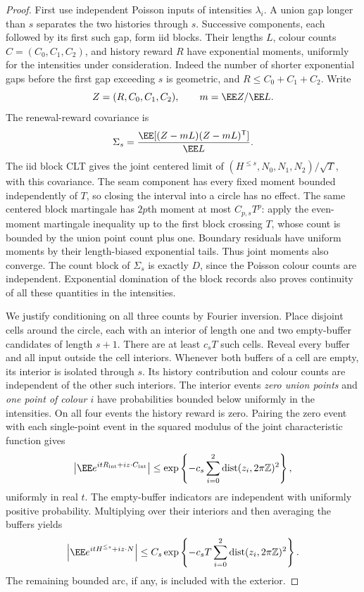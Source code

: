 \documentclass[11pt,letterpaper]{article}
\begin{document}
\begin{proof}
First use independent Poisson inputs of intensities $\lambda_i$.
A union gap longer than $s$ separates the two histories
through $s$. Successive components, each followed by its
first such gap, form iid blocks. Their lengths $L$, colour
counts $C=(C_0,C_1,C_2)$, and history reward $R$ have
exponential moments, uniformly for the intensities under
consideration. Indeed the number of shorter exponential
gaps before the first gap exceeding $s$ is geometric,
and $R\le C_0+C_1+C_2$.
Write
\[
 Z=(R,C_0,C_1,C_2),\qquad m=\EE Z/\EE L.
\]
The renewal-reward covariance is
\[
 \Sigma_s=\frac{\EE[(Z-mL)(Z-mL)^{\mathsf T}]}{\EE L}.
\]
The iid block CLT gives the joint centered limit of
$(H^{\le s},N_0,N_1,N_2)/\sqrt T$, with this covariance.
The seam component has every fixed moment bounded independently
of $T$, so closing the interval into a circle has no effect.
The same centered block martingale has $2p$th moment at most
$C_{p,s}T^p$: apply the even-moment martingale inequality up to
the first block crossing $T$, whose count is bounded by the
union point count plus one. Boundary residuals have uniform
moments by their length-biased exponential tails.
Thus joint moments also converge. The count block of
$\Sigma_s$ is exactly $D$, since the Poisson colour counts
are independent. Exponential domination of the block records
also proves continuity of all these quantities in the intensities.

We justify conditioning on all three counts by Fourier inversion.
Place disjoint cells around the circle, each with an interior
of length one and two empty-buffer candidates of length $s+1$.
There are at least $c_sT$ such cells. Reveal every buffer
and all input outside the cell interiors.
Whenever both buffers of a cell are empty, its interior is
isolated through $s$. Its history contribution and colour
counts are independent of the other such interiors.
The interior events \emph{zero union points} and \emph{one point
of colour $i$} have probabilities bounded below uniformly in
the intensities. On all four events the history reward is zero.
Pairing the zero event with each single-point event in the
squared modulus of the joint characteristic function gives
\[
 \left|\EE e^{itR_{\rm int}+i z\cdot C_{\rm int}}\right|
       \le \exp\left\{-c_s
                    \sum_{i=0}^2\operatorname{dist}(z_i,2\pi\mathbb Z)^2\right\},
\]
uniformly in real $t$. The empty-buffer indicators are
independent with uniformly positive probability. Multiplying
over their interiors and then averaging the buffers yields
\begin{equation}\label{eq:dense-count-Fourier}
 \left|\EE e^{itH^{\le s}+i z\cdot N}\right|
       \le C_s\exp\left\{-c_sT
                 \sum_{i=0}^2\operatorname{dist}(z_i,2\pi\mathbb Z)^2\right\}.
\end{equation}
The remaining bounded arc, if any, is included with the exterior.


\end{proof}
\end{document}
